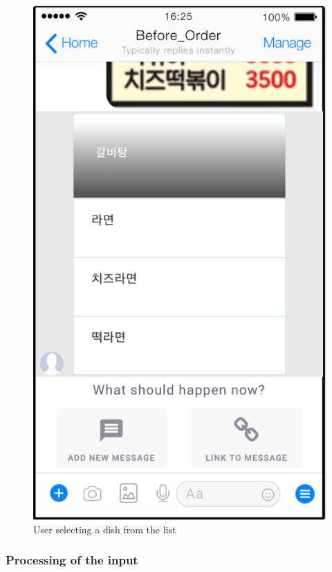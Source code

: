 \begin{figure}[htbp]
\centerline{\includegraphics[height=\custompicheight]{./pictures/facebook_response_selection}}
\caption{User selecting a dish from the list}
\label{fig:facebook_response_selection}
\end{figure}
\FloatBarrier

\subsubsection{Processing of the input}

